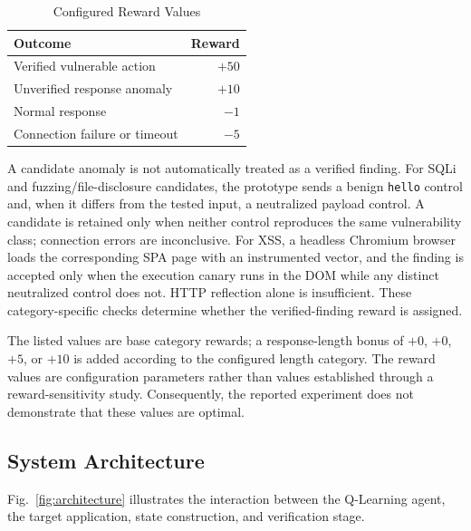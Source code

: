 \documentclass[conference]{IEEEtran}
\begin{document}
\begin{table}[!t]
\caption{Configured Reward Values}
\label{tab:rewards}
\centering
\footnotesize
\begin{tabular}{p{}r}
\toprule
\textbf{Outcome} & \textbf{Reward}\\
\midrule
Verified vulnerable action & $+50$\\
Unverified response anomaly & $+10$\\
Normal response & $-1$\\
Connection failure or timeout & $-5$\\
\bottomrule
\end{tabular}
\end{table}

A candidate anomaly is not automatically treated as a
verified finding. For SQLi and fuzzing/file-disclosure
candidates, the prototype sends a benign \texttt{hello}
control and, when it differs from the tested input, a
neutralized payload control. A candidate is retained only
when neither control reproduces the same vulnerability class;
connection errors are inconclusive. For XSS, a headless
Chromium browser loads the corresponding SPA page with an
instrumented vector, and the finding is accepted only when
the execution canary runs in the DOM while any distinct
neutralized control does not. HTTP reflection alone is
insufficient. These category-specific checks determine
whether the verified-finding reward is assigned.

The listed values are base category rewards; a response-length
bonus of $+0$, $+0$, $+5$, or $+10$ is added according to the
configured length category. The reward values are configuration
parameters rather than values established through a
reward-sensitivity study. Consequently, the reported experiment
does not demonstrate that these values are optimal.

\subsection{System Architecture}

Fig.~\ref{fig:architecture} illustrates the interaction
between the Q-Learning agent, the target application,
state construction, and verification stage.
\end{document}
